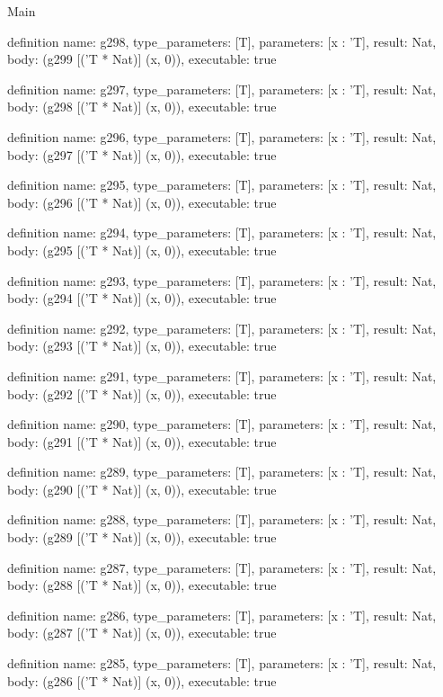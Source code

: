 \begin{lexlean}{Main}
\begin{semanticmodule}
definition{
  name: g298,
  type_parameters: [T],
  parameters: [x : 'T],
  result: Nat,
  body: (g299 [('T * Nat)] (x, 0)),
  executable: true
}

definition{
  name: g297,
  type_parameters: [T],
  parameters: [x : 'T],
  result: Nat,
  body: (g298 [('T * Nat)] (x, 0)),
  executable: true
}

definition{
  name: g296,
  type_parameters: [T],
  parameters: [x : 'T],
  result: Nat,
  body: (g297 [('T * Nat)] (x, 0)),
  executable: true
}

definition{
  name: g295,
  type_parameters: [T],
  parameters: [x : 'T],
  result: Nat,
  body: (g296 [('T * Nat)] (x, 0)),
  executable: true
}

definition{
  name: g294,
  type_parameters: [T],
  parameters: [x : 'T],
  result: Nat,
  body: (g295 [('T * Nat)] (x, 0)),
  executable: true
}

definition{
  name: g293,
  type_parameters: [T],
  parameters: [x : 'T],
  result: Nat,
  body: (g294 [('T * Nat)] (x, 0)),
  executable: true
}

definition{
  name: g292,
  type_parameters: [T],
  parameters: [x : 'T],
  result: Nat,
  body: (g293 [('T * Nat)] (x, 0)),
  executable: true
}

definition{
  name: g291,
  type_parameters: [T],
  parameters: [x : 'T],
  result: Nat,
  body: (g292 [('T * Nat)] (x, 0)),
  executable: true
}

definition{
  name: g290,
  type_parameters: [T],
  parameters: [x : 'T],
  result: Nat,
  body: (g291 [('T * Nat)] (x, 0)),
  executable: true
}

definition{
  name: g289,
  type_parameters: [T],
  parameters: [x : 'T],
  result: Nat,
  body: (g290 [('T * Nat)] (x, 0)),
  executable: true
}

definition{
  name: g288,
  type_parameters: [T],
  parameters: [x : 'T],
  result: Nat,
  body: (g289 [('T * Nat)] (x, 0)),
  executable: true
}

definition{
  name: g287,
  type_parameters: [T],
  parameters: [x : 'T],
  result: Nat,
  body: (g288 [('T * Nat)] (x, 0)),
  executable: true
}

definition{
  name: g286,
  type_parameters: [T],
  parameters: [x : 'T],
  result: Nat,
  body: (g287 [('T * Nat)] (x, 0)),
  executable: true
}

definition{
  name: g285,
  type_parameters: [T],
  parameters: [x : 'T],
  result: Nat,
  body: (g286 [('T * Nat)] (x, 0)),
  executable: true
}


\end{semanticmodule}
\end{lexlean}
